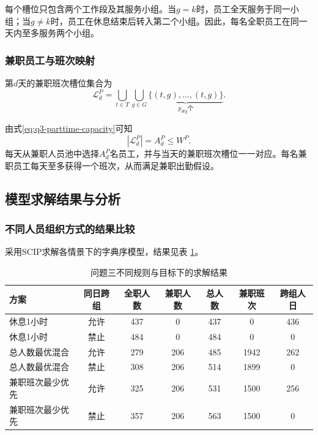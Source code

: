 \documentclass[withoutpreface,bwprint]{cumcmthesis}
\begin{document}
每个槽位只包含两个工作段及其服务小组。当$g=k$时，员工全天服务于同一小组；当$g\neq k$时，员工在休息结束后转入第二个小组。因此，每名全职员工在同一天内至多服务两个小组。

\subsubsection{兼职员工与班次映射}

第$d$天的兼职班次槽位集合为
\begin{equation}
\mathcal L_d^P
=
\bigcup_{t\in T}
\bigcup_{g\in G}
\underbrace{
\{(t,g),\ldots,(t,g)\}
}_{p_{dtg}\text{个}}.
\label{eq:q3-parttime-slot}
\end{equation}

由式\eqref{eq:q3-parttime-capacity}可知
\[
|\mathcal L_d^P|
=
A_d^P
\leq W^P.
\]
每天从兼职人员池中选择$A_d^P$名员工，并与当天的兼职班次槽位一一对应。每名兼职员工每天至多获得一个班次，从而满足兼职出勤假设。

\subsection{模型求解结果与分析}

\subsubsection{不同人员组织方式的结果比较}

采用SCIP求解各情景下的字典序模型，结果见表
\ref{tab:q3-scenario-results}。

\begin{table}[H]
\centering
\caption{问题三不同规则与目标下的求解结果}
\label{tab:q3-scenario-results}
\small
\begin{tabular}{lcccccc}
\toprule
方案 & 同日跨组 & 全职人数 & 兼职人数 & 总人数 & 兼职班次 & 跨组人日\\
\midrule
休息1小时 & 允许 & 437 & 0 & 437 & 0 & 436\\
休息1小时 & 禁止 & 484 & 0 & 484 & 0 & 0\\
总人数最优混合 & 允许 & 279 & 206 & 485 & 1942 & 262\\
总人数最优混合 & 禁止 & 308 & 206 & 514 & 1899 & 0\\
兼职班次最少优先 & 允许 & 325 & 206 & 531 & 1500 & 256\\
兼职班次最少优先 & 禁止 & 357 & 206 & 563 & 1500 & 0\\
\bottomrule
\end{tabular}
\end{table}
\end{document}
